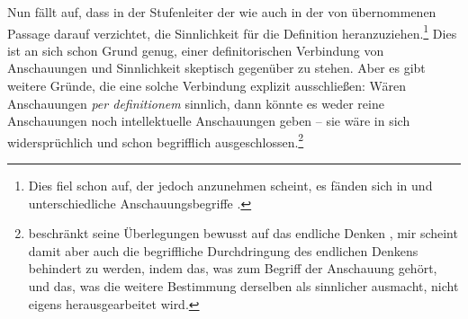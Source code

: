 Nun fällt auf, dass  in der Stufenleiter der  wie auch in der von  übernommenen
Passage darauf verzichtet, die Sinnlichkeit für die Definition
heranzuziehen.\footnote{Dies fiel schon  auf, der jedoch
anzunehmen scheint, es fänden sich in {\jaeschelogik} und
 unterschiedliche Anschauungsbegriffe
\parencite[vgl.][27]{Frege:DieGrundlagenderArithmetik1988}.}
Dies ist an sich schon Grund genug, einer definitorischen Verbindung von
Anschauungen und Sinnlichkeit skeptisch gegenüber zu stehen. Aber es gibt
weitere Gründe, die eine solche Verbindung explizit ausschließen: Wären
Anschauungen \emph{per definitionem} sinnlich, dann könnte es weder reine
Anschauungen noch intellektuelle Anschauungen geben -- sie wäre in sich
widersprüchlich und schon begrifflich
ausgeschlossen.\footnote{
beschränkt seine Überlegungen bewusst auf das endliche Denken
\parencite[vgl.][\pno~547,
Anm.]{Willaschek:DertranszendentaleIdealismusunddieIdealitaetvonRaumundZeit1997},
mir scheint damit aber auch die begriffliche Durchdringung des endlichen Denkens
behindert zu werden, indem das, was zum Begriff der Anschauung gehört, und das,
was die weitere Bestimmung derselben als sinnlicher ausmacht, nicht eigens
herausgearbeitet wird.}

